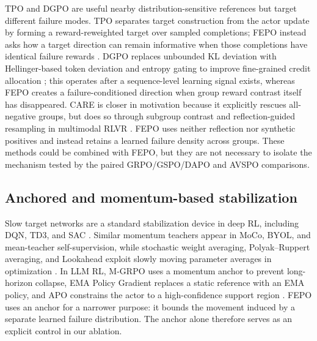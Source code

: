 \documentclass{article}
\newcommand{\FEPO}{\textsc{FEPO}\xspace}
\begin{document}
TPO and DGPO are useful nearby distribution-sensitive references but target different failure modes. TPO separates target construction from the actor update by forming a reward-reweighted target over sampled completions; FEPO instead asks how a target direction can remain informative when those completions have identical failure rewards \citep{kaddour2026tpo}. DGPO replaces unbounded KL deviation with Hellinger-based token deviation and entropy gating to improve fine-grained credit allocation \citep{jin2026dgpo}; this operates after a sequence-level learning signal exists, whereas FEPO creates a failure-conditioned direction when group reward contrast itself has disappeared. CARE is closer in motivation because it explicitly rescues all-negative groups, but does so through subgroup contrast and reflection-guided resampling in multimodal RLVR \citep{wang2025care}. FEPO uses neither reflection nor synthetic positives and instead retains a learned failure density across groups. These methods could be combined with FEPO, but they are not necessary to isolate the mechanism tested by the paired GRPO/GSPO/DAPO and AVSPO comparisons.


\subsection{Anchored and momentum-based stabilization}
Slow target networks are a standard stabilization device in deep RL, including DQN, TD3, and SAC \citep{mnih2015dqn,fujimoto2018td3,haarnoja2018sac}. Similar momentum teachers appear in MoCo, BYOL, and mean-teacher self-supervision, while stochastic weight averaging, Polyak--Ruppert averaging, and Lookahead exploit slowly moving parameter averages in optimization \citep{he2019moco,grill2020byol,tarvainen2017meanteacher,izmailov2018swa,polyak1992averaging,ruppert1988efficient,zhang2019lookahead}. In LLM RL, M-GRPO uses a momentum anchor to prevent long-horizon collapse, EMA Policy Gradient replaces a static reference with an EMA policy, and APO constrains the actor to a high-confidence support region \citep{mgrpo2025,emappg2026,apo2026}. \FEPO uses an anchor for a narrower purpose: it bounds the movement induced by a separate learned failure distribution. The anchor alone therefore serves as an explicit control in our ablation.
\end{document}
